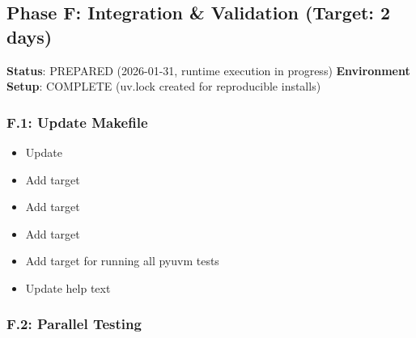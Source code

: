 \subsection{Phase F: Integration \& Validation (Target: 2 days)}\label{cr:status:pyuvm-migration:phase-f-integration-validation-target-2-days}

\begin{record}

\textbf{Status}: \ok{} PREPARED (2026-01-31, runtime execution in
progress) \textbf{Environment Setup}: \ok{} COMPLETE (uv.lock created
for reproducible installs)

\end{record}

\subsubsection{F.1: Update Makefile}\label{cr:status:pyuvm-migration:f1-update-makefile}

\begin{record}

\begin{itemize}
\tightlist
\item[$\square$]
  Update 
\item[$\square$]
  Add  target
\item[$\square$]
  Add  target
\item[$\square$]
  Add  target
\item[$\square$]
  Add  target for running all pyuvm tests
\item[$\square$]
  Update help text
\end{itemize}

\end{record}

\subsubsection{F.2: Parallel Testing}\label{cr:status:pyuvm-migration:f2-parallel-testing}

